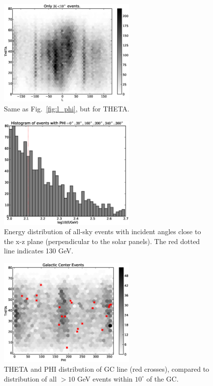 \documentclass[aps,twocolumn,prd,superscriptaddress,showpacs,nofootinbib,fixfloat]{revtex4}
\begin{document}
\begin{figure}
\centering
\includegraphics[width=0.6\textwidth]{plots/L_THETA.eps}
\caption{Same as Fig.~\ref{fig:l_phi}, but for THETA.}
\label{fig:l_theta}
\end{figure}

\begin{figure}
\centering
\includegraphics[width=0.6\textwidth]{plots/spectrum_phi.eps}
\caption{Energy distribution of all-sky events with incident angles close to
the x-z plane (perpendicular to the solar panels). The red dotted line
indicates 130 GeV.}
\label{fig:spectrum_phi}
\end{figure}

\begin{figure}
\centering
\includegraphics[width=0.6\textwidth]{plots/GC_THETA_PHI.eps}
\caption{THETA and PHI distribution of GC line (red crosses), compared to
distribution of all $>10$ GeV events within $10^\circ$ of the GC.}
\label{fig:gc_theta_phi}
\end{figure}
\end{document}
